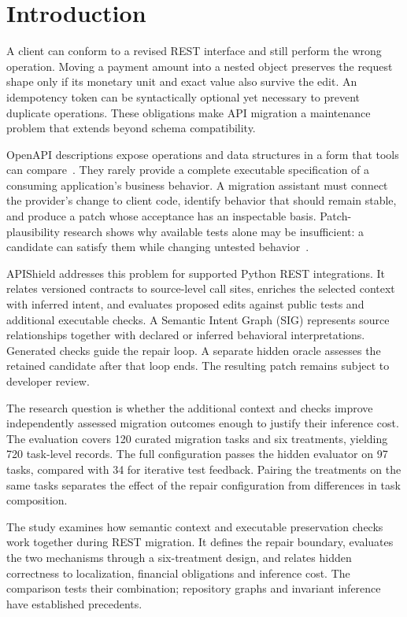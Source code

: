 \section{Introduction}
A client can conform to a revised REST interface and still perform the wrong operation. Moving a payment amount into a nested object preserves the request shape only if its monetary unit and exact value also survive the edit. An idempotency token can be syntactically optional yet necessary to prevent duplicate operations. These obligations make API migration a maintenance problem that extends beyond schema compatibility.

OpenAPI descriptions expose operations and data structures in a form that tools can compare~\cite{openapi}. They rarely provide a complete executable specification of a consuming application's business behavior. A migration assistant must connect the provider's change to client code, identify behavior that should remain stable, and produce a patch whose acceptance has an inspectable basis. Patch-plausibility research shows why available tests alone may be insufficient: a candidate can satisfy them while changing untested behavior~\cite{plausibility2015}.

APIShield addresses this problem for supported Python REST integrations. It relates versioned contracts to source-level call sites, enriches the selected context with inferred intent, and evaluates proposed edits against public tests and additional executable checks. A Semantic Intent Graph (SIG) represents source relationships together with declared or inferred behavioral interpretations. Generated checks guide the repair loop. A separate hidden oracle assesses the retained candidate after that loop ends. The resulting patch remains subject to developer review.

The research question is whether the additional context and checks improve independently assessed migration outcomes enough to justify their inference cost. The evaluation covers 120 curated migration tasks and six treatments, yielding 720 task-level records. The full configuration passes the hidden evaluator on 97 tasks, compared with 34 for iterative test feedback. Pairing the treatments on the same tasks separates the effect of the repair configuration from differences in task composition.

The study examines how semantic context and executable preservation checks work together during REST migration. It defines the repair boundary, evaluates the two mechanisms through a six-treatment design, and relates hidden correctness to localization, financial obligations and inference cost. The comparison tests their combination; repository graphs and invariant inference have established precedents.

